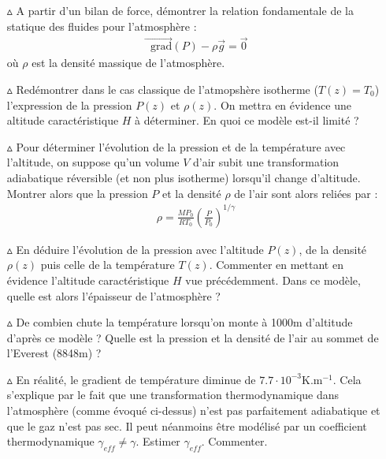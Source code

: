\documentclass{report}
\newcommand*\grad{\mathop{}\!\mathrm{grad}}
\begin{document}
\begin{itemize}

	\item[$\vartriangle$] A partir d'un bilan de force, démontrer la relation fondamentale de la statique des fluides pour l'atmosphère : 
	\begin{align*}
		\vec{\grad}(P) - \rho\vec{g}=\vec{0}
	\end{align*}
		où $\rho$ est la densité massique de l'atmosphère.
		
	\item[$\vartriangle$] Redémontrer dans le cas classique de l'atmopshère isotherme ($T(z)=T_0$) l'expression de la pression $P(z)$ et $\rho(z)$. On mettra en évidence une altitude caractéristique $H$ à déterminer. En quoi ce modèle est-il limité ?
		
	\item[$\vartriangle$] Pour déterminer l'évolution de la pression et de la température avec l'altitude, on suppose qu'un volume $V$ d'air subit une transformation adiabatique réversible (et non plus isotherme) lorsqu'il change d'altitude. Montrer alors que la pression $P$ et la densité $\rho$ de l'air sont alors reliées par :
	\begin{align*}
		\rho = \frac{MP_0}{RT_0}\left(\frac{P}{P_0} \right) ^{1/\gamma}
	\end{align*}

	\item[$\vartriangle$] En déduire l'évolution de la pression avec l'altitude $P(z)$, de la densité $\rho(z)$ puis celle de la température $T(z)$. Commenter en mettant en évidence l'altitude caractéristique $H$ vue précédemment. Dans ce modèle, quelle est alors l'épaisseur de l'atmosphère ?
	
	\item[$\vartriangle$] De combien chute la température lorsqu'on monte à 1000m d'altitude d'après ce modèle ? Quelle est la pression et la densité de l'air au sommet de l'Everest (8848m) ?
	
	\item[$\vartriangle$] En réalité, le gradient de température diminue de $7.7\cdot10^{-3}$K.m$^{-1}$. Cela s'explique par le fait que une transformation thermodynamique dans l'atmosphère (comme évoqué ci-dessus) n'est pas parfaitement adiabatique et que le gaz n'est pas sec. Il peut néanmoins être modélisé par un coefficient thermodynamique $\gamma_{eff}\neq\gamma$. Estimer $\gamma_{eff}$. Commenter. 

\end{itemize}
\end{document}
